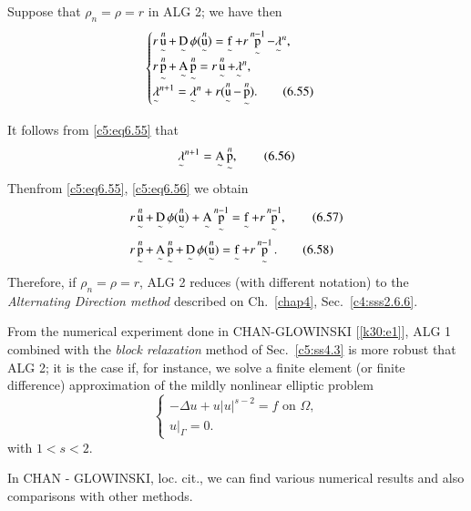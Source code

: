 \begin{remark}\label{c5:rem6.6}%
Suppose that $\rho_n = \rho = r$ in ALG 2; we have then
\begin{equation}
\begin{cases}
r \operatorname*{u}\limits_\sim^n + \operatorname*{D}\limits_\sim \phi (\operatorname*{u}\limits_\sim^n ) = \operatorname*{f}\limits_\sim + r \operatorname*{p}\limits_\sim^{n-1} - \underset{\sim}\lambda^n, \\
r\operatorname*{p}\limits_\sim^n + \operatorname*{A}\limits_\sim \operatorname*{p}\limits_\sim^n = r \operatorname*{u}\limits_\sim^n + \underset{\sim}\lambda^n, \\
\underset{\sim}\lambda^{n+1} = \underset{\sim}\lambda^n + r 
(\operatorname*{u}\limits_\sim^n - \operatorname*{p}\limits_\sim^n ). \tag{6.55}\label{c5:eq6.55} 
\end{cases}
\end{equation} 
\end{remark}
It follows from \eqref{c5:eq6.55} that 
\begin{equation}
\underset{\sim}\lambda^{n+1} =  \operatorname*{A}\limits_\sim \operatorname*{p}\limits_\sim^n, 
\tag{6.56}\label{c5:eq6.56} 
\end{equation}
Then\pageoriginale   from \eqref{c5:eq6.55}, \eqref{c5:eq6.56} we obtain 
\begin{align*}
&r \operatorname*{u}\limits_\sim^n + \operatorname*{D}\limits_\sim\phi (\operatorname*{u}\limits_\sim^n ) + 
\operatorname*{A}\limits_\sim \operatorname*{p}\limits_\sim^{n-1} = \operatorname*{f}\limits_\sim + r 
\operatorname*{p}\limits_\sim^{n-1}, \tag{6.57}\label{c5:eq6.57}\\  
& r \operatorname*{p}\limits_\sim^n + \operatorname*{A}\limits_\sim \operatorname*{p}\limits_\sim^n + 
\operatorname*{D}\limits_\sim\phi (\operatorname*{u}\limits_\sim^n ) = \operatorname*{f}\limits_\sim+ r 
\operatorname*{p}\limits_\sim^{n-1}. \tag{6.58}\label{c5:eq6.58}  
\end{align*}
Therefore, if $\rho_n = \rho = r$,  ALG 2 reduces (with different 
notation) to the \textit{Alternating Direction method} described on 
Ch.~\ref{chap4}, Sec.~\ref{c4:sss2.6.6}.  

\begin{remark}\label{c5:rem6.7}%
From  the numerical experiment done in CHAN-GLOW\-INSKI [\ref{k30:e1}], ALG 1 
combined with the {\em block relaxation} method of Sec.~\ref{c5:ss4.3} is more 
robust that ALG 2; it is the case if,  for instance, we solve a finite 
element (or finite difference) approximation of the mildly nonlinear 
elliptic problem     
 \begin{equation}
\begin{cases}
-\Delta u + u | u |^{s - 2} = f \text{ on }\Omega, \\
u|_\Gamma  = 0. \tag{6.59}\label{c5:eq6.59}
\end{cases}
 \end{equation} 
 with $1 < s<2$. 
\end{remark}
In CHAN - GLOWINSKI, loc. cit., we can find various numerical results 
and also comparisons with other methods.  

